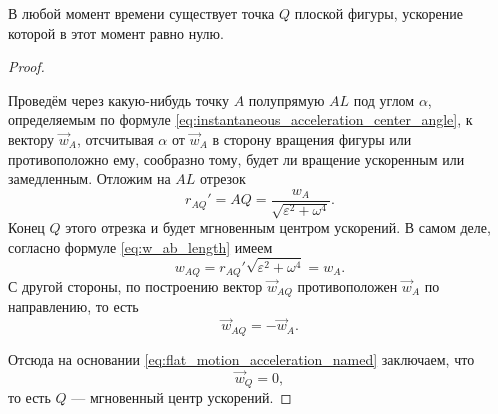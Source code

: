 \begin{theorem}
  В любой момент времени существует точка $Q$ плоской фигуры, ускорение которой
  в этот момент равно нулю.
\end{theorem}

\begin{proof}
  \begin{figure}[H]
    \centering

    \caption{}
    \label{fig:18_1}
  \end{figure}

  Проведём через какую-нибудь точку $A$ полупрямую $AL$ под углом $\alpha$,
  определяемым по формуле \ref{eq:instantaneous_acceleration_center_angle}, к
  вектору $\vec{w}_A$, отсчитывая $\alpha$ от $\vec{w}_A$ в сторону вращения
  фигуры или противоположно ему, сообразно тому, будет ли вращение ускоренным
  или замедленным. Отложим на $AL$ отрезок
  \begin{equation}
    \label{eq:instantaneous_acceleration_center_distance}
    r_{AQ}' = AQ = \frac{w_A}{\sqrt{\varepsilon^2 + \omega^4}}.
  \end{equation}
  Конец $Q$ этого отрезка и будет мгновенным центром ускорений. В самом деле,
  согласно формуле \ref{eq:w_ab_length} имеем
  \begin{equation*}
    w_{AQ} = r_{AQ}' \sqrt{\varepsilon^2 + \omega^4} = w_A.
  \end{equation*}
  С другой стороны, по построению вектор $\vec{w}_{AQ}$ противоположен
  $\vec{w}_A$ по направлению, то есть
  \begin{equation*}
    \vec{w}_{AQ} = -\vec{w}_A.
  \end{equation*}

  Отсюда на основании \ref{eq:flat_motion_acceleration_named} заключаем, что
  \begin{equation*}
    \vec{w}_Q = 0,
  \end{equation*}
  то есть $Q$ --- мгновенный центр ускорений.
\end{proof}

